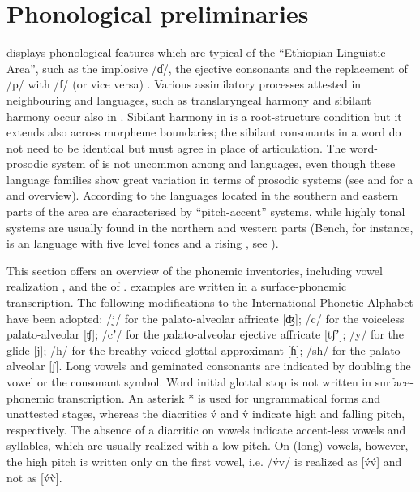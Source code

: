 \documentclass[output=paper]{LSP/langsci}
\begin{document}
\section{Phonological preliminaries} \label{sec:Petrollino:2}

 displays phonological features which are typical of the “Ethiopian Linguistic Area”, such as the implosive /ɗ/, the ejective consonants and the replacement of /p/ with /f/ (or vice versa) \citep{Ferguson1970,Ferguson1976,CrassMeyer2008}. Various assimilatory processes attested in neighbouring  and  languages, such as translaryngeal harmony and sibilant harmony \citep{Hayward1988} occur also in . Sibilant harmony in  is a root-structure condition but it extends also across morpheme boundaries; the sibilant consonants in a word do not need to be identical but must agree in place of articulation. The word-prosodic system of  is not uncommon among  and  languages, even though these language families show great variation in terms of prosodic systems (see \citealt{Mous2012} and \citealt{Azeb2012} for a  and  overview). According to \citet[438]{Azeb2012} the languages located in the southern and eastern parts of the  area are characterised by “pitch-accent” systems, while highly tonal systems are usually found in the northern and western parts (Bench, for instance, is an  language with five level tones and a rising , see \citealt{Rapold2006}).

This section offers an overview of the phonemic inventories, including vowel realization , and the   of .  examples are written in a surface-phonemic transcription. The following modifications to the International Phonetic Alphabet have been adopted: /j/ for the palato-alveolar affricate [ʤ]; /c/ for the voiceless palato-alveolar [ʧ]; /cʼ/ for the palato-alveolar ejective affricate [tʃʼ]; /y/ for the glide [j]; /h/ for the breathy-voiced glottal approximant [ɦ]; /sh/ for the palato-alveolar [ʃ]. Long vowels and geminated consonants are indicated by doubling the vowel or the consonant symbol. Word initial glottal stop is not written in surface-phonemic transcription. An asterisk * is used for ungrammatical forms and unattested stages, whereas the diacritics v́ and v̂ indicate high and falling pitch, respectively. The absence of a diacritic on vowels indicate accent-less vowels and syllables, which are usually realized with a low pitch. On  (long) vowels, however, the high pitch is written only on the first vowel, i.e. /v́v/ is realized as [v́v́] and not as [v́v̀].   
\end{document}
